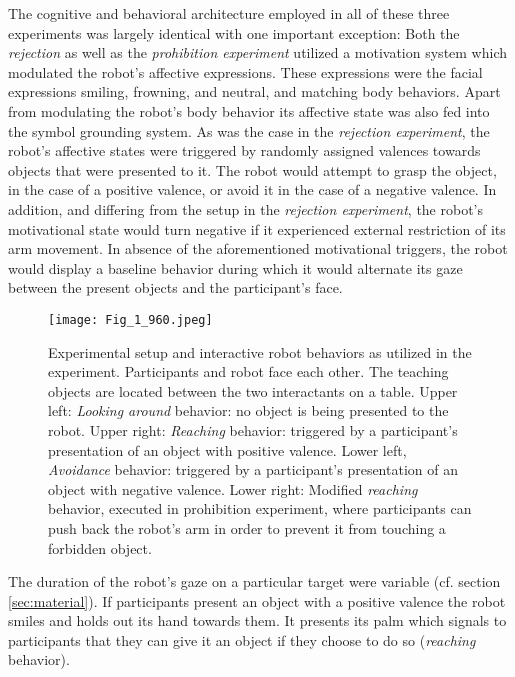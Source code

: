 The cognitive and behavioral architecture employed in all of these three experiments was largely identical with one important exception: Both the \emph{rejection}
as well as the \emph{prohibition experiment} utilized a motivation system which modulated the robot's affective expressions. These expressions were the facial expressions
smiling, frowning, and neutral, and matching body behaviors. Apart from modulating the robot's body behavior its affective state was also fed into the
symbol grounding system. As was the case in the \emph{rejection experiment}, the robot's affective states were triggered by randomly assigned valences
towards objects that were presented to it. The robot would attempt to grasp the object, in the case of a positive valence, or avoid it in the case of a negative valence.
In addition, and differing from the setup in the \emph{rejection experiment}, the robot's motivational state would turn
negative if it experienced external restriction of its arm movement.
In absence of the aforementioned motivational triggers, the robot would display a baseline behavior during which it would alternate its gaze between the
present objects and the participant's face.

\begin{figure}[ht]
\centerline{\texttt{[image: Fig\_1\_960.jpeg]}} \caption{Experimental setup and interactive robot behaviors as utilized in the experiment. Participants and robot face each other. The teaching objects
  are located between the two interactants on a table. Upper left: \emph{Looking around} behavior: no object is being presented to the robot.
  Upper right: \emph{Reaching} behavior: triggered by a participant's presentation of an object with positive valence. Lower left, \emph{Avoidance} behavior:
  triggered by a participant's presentation of an object with negative valence. Lower right: Modified \emph{reaching} behavior, executed in prohibition
  experiment, where participants can push back the robot's arm in order to prevent it from touching a forbidden object.}
\label{phys_setup}
\end{figure}

\noindent The duration of the robot's gaze on a particular target were variable (cf. section \ref{sec:material}). If participants present an object with
a positive valence the robot smiles and holds out its hand towards them. It presents its palm which signals to participants that they can give it an
object if they choose to do so (\emph{reaching} behavior).

